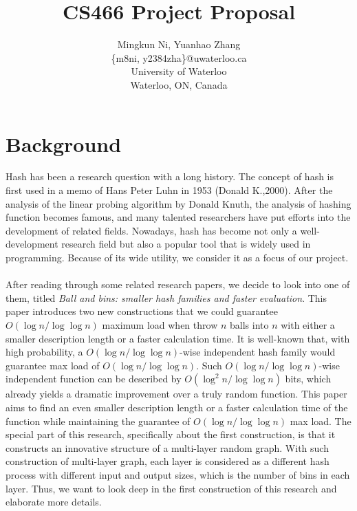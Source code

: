 \documentclass[letterpaper]{article} %
\begin{document}
	\title{CS466 Project Proposal}
	\author{Mingkun Ni, Yuanhao Zhang\\
		\{m8ni, y2384zha\}@uwaterloo.ca\\
		University of Waterloo\\
		Waterloo, ON, Canada\\
	}
	\maketitle
		
	\section{Background}
	Hash has been a research question with a long history. The concept of hash is first used in a memo of Hans Peter Luhn in 1953 (Donald K.,2000). After the analysis of the linear probing algorithm by Donald Knuth, the analysis of hashing function becomes famous, and many talented researchers have put efforts into the development of related fields. Nowadays, hash has become not only a well-development research field but also a popular tool that is widely used in programming. Because of its wide utility, we consider it as a focus of our project.\\\\
	\quad After reading through some related research papers, we decide to look into one of them, titled \textit{Ball and bins: smaller hash families and faster evaluation}. This paper introduces two new constructions that we could guarantee $O(\log n/\log\log n)$ maximum load when throw $n$ balls into $n$ with either a smaller description length or a faster calculation time. It is well-known that, with high probability, a $O(\log n/\log\log n)$-wise independent hash family would guarantee max load of $O(\log n/\log\log n)$. Such $O(\log n/\log\log n)$-wise independent function can be described by $O(\log^2 n/\log\log n)$ bits, which already yields a dramatic improvement over a truly random function. This paper aims to find an even smaller description length or a faster calculation time of the function while maintaining the guarantee of $O(\log n/\log\log n)$ max load. The special part of this research, specifically about the first construction, is that it constructs an innovative structure of a multi-layer random graph. With such construction of multi-layer graph, each layer is considered as a different hash process with different input and output sizes, which is the number of bins in each layer. Thus, we want to look deep in the first construction of this research and elaborate more details.
	
\end{document}
